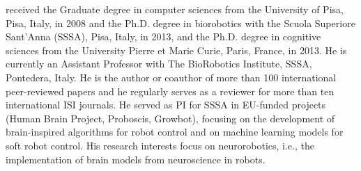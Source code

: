received the Graduate degree in computer sciences from the University of Pisa, Pisa, Italy, in 2008 and the Ph.D. degree in biorobotics with the Scuola Superiore Sant'Anna (SSSA), Pisa, Italy, in 2013, and the Ph.D. degree in cognitive sciences from the University Pierre et Marie Curie, Paris, France, in 2013.
He is currently an Assistant Professor with The BioRobotics Institute, SSSA, Pontedera, Italy. He is the author or coauthor of more than 100 international peer-reviewed papers and he regularly serves as a reviewer for more than ten international ISI journals. He served as PI for SSSA in EU-funded projects (Human Brain Project, Proboscis, Growbot), focusing on the development of brain-inspired algorithms for robot control and on machine learning models for soft robot control. His research interests focus on neurorobotics, i.e., the implementation of brain models from neuroscience in robots.